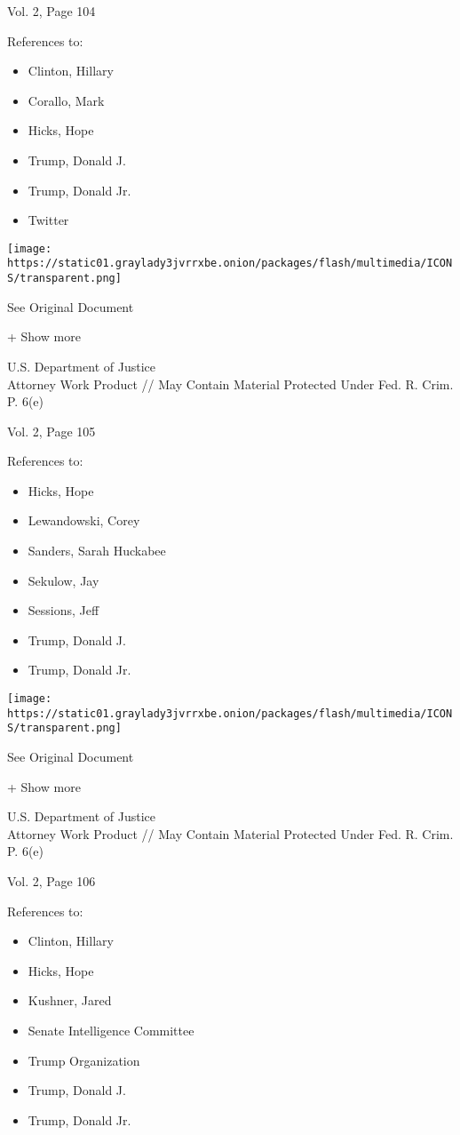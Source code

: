 Vol. 2, Page 104

References to:

\begin{itemize}
\tightlist
\item
  Clinton, Hillary
\item
  Corallo, Mark
\item
  Hicks, Hope
\item
  Trump, Donald J.
\item
  Trump, Donald Jr.
\item
  Twitter
\end{itemize}

\protect\hyperlink{}{}

\texttt{[image: https://static01.graylady3jvrrxbe.onion/packages/flash/multimedia/ICONS/transparent.png]}

See Original Document

+ Show more

U.S. Department of Justice\\
Attorney Work Product // May Contain Material Protected Under Fed. R.
Crim. P. 6(e)

Vol. 2, Page 105

References to:

\begin{itemize}
\tightlist
\item
  Hicks, Hope
\item
  Lewandowski, Corey
\item
  Sanders, Sarah Huckabee
\item
  Sekulow, Jay
\item
  Sessions, Jeff
\item
  Trump, Donald J.
\item
  Trump, Donald Jr.
\end{itemize}

\protect\hyperlink{}{}

\texttt{[image: https://static01.graylady3jvrrxbe.onion/packages/flash/multimedia/ICONS/transparent.png]}

See Original Document

+ Show more

U.S. Department of Justice\\
Attorney Work Product // May Contain Material Protected Under Fed. R.
Crim. P. 6(e)

Vol. 2, Page 106

References to:

\begin{itemize}
\tightlist
\item
  Clinton, Hillary
\item
  Hicks, Hope
\item
  Kushner, Jared
\item
  Senate Intelligence Committee
\item
  Trump Organization
\item
  Trump, Donald J.
\item
  Trump, Donald Jr.
\end{itemize}

